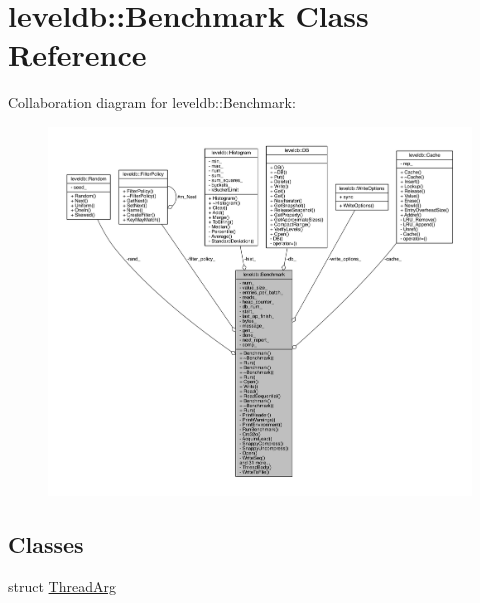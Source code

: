 \hypertarget{classleveldb_1_1_benchmark}{}\section{leveldb\+:\+:Benchmark Class Reference}
\label{classleveldb_1_1_benchmark}


Collaboration diagram for leveldb\+:\+:Benchmark\+:
\nopagebreak
\begin{figure}[H]
\begin{center}
\leavevmode
\includegraphics[width=350pt]{classleveldb_1_1_benchmark__coll__graph}
\end{center}
\end{figure}
\subsection*{Classes}
\begin{DoxyCompactItemize}
\item 
struct \hyperlink{structleveldb_1_1_benchmark_1_1_thread_arg}{Thread\+Arg}
\end{DoxyCompactItemize}
